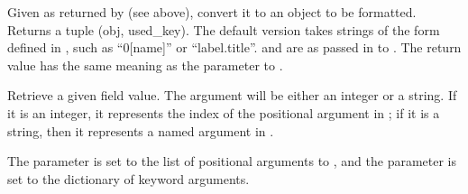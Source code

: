 \documentclass[letterpaper,10pt,english]{sphinxmanual}
\begin{document}
\begin{fulllineitems}
\begin{fulllineitems}
\label{\detokenize{string:string.Formatter.get_field}}
Given  as returned by {\hyperref[\detokenize{string:string.Formatter.parse}]{}} (see above), convert it to
an object to be formatted.  Returns a tuple (obj, used\_key).  The default
version takes strings of the form defined in , such as
“0{[}name{]}” or “label.title”.   and  are as passed in to
{\hyperref[\detokenize{string:string.Formatter.vformat}]{}}.  The return value  has the same meaning as the
 parameter to {\hyperref[\detokenize{string:string.Formatter.get_value}]{}}.

\end{fulllineitems}


\vspace{5px}

\begin{fulllineitems}
\label{\detokenize{string:string.Formatter.get_value}}
Retrieve a given field value.  The  argument will be either an
integer or a string.  If it is an integer, it represents the index of the
positional argument in ; if it is a string, then it represents a
named argument in .

The  parameter is set to the list of positional arguments to
{\hyperref[\detokenize{string:string.Formatter.vformat}]{}}, and the  parameter is set to the dictionary of
keyword arguments.


\end{fulllineitems}
\end{fulllineitems}
\end{document}

